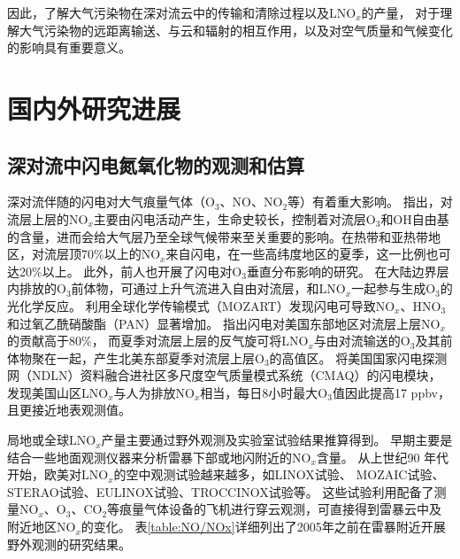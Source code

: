 因此，了解大气污染物在深对流云中的传输和清除过程以及LNO$_x$的产量，
对于理解大气污染物的远距离输送、与云和辐射的相互作用，以及对空气质量和气候变化的影响具有重要意义。



\section{国内外研究进展}

\subsection{深对流中闪电氮氧化物的观测和估算} \label{sec:intro_lnox}

深对流伴随的闪电对大气痕量气体（O$_3$、NO、NO$_2$等）有着重大影响\citep{DeCaria.2005,Schumann.2007,Ott.2010,Banerjee.2014}。
\citet{Levy.1996}指出，对流层上层的NO$_x$主要由闪电活动产生，生命史较长，控制着对流层O$_3$和OH自由基的含量，进而会给大气层乃至全球气候带来至关重要的影响。在热带和亚热带地区，对流层顶70\%以上的NO$_x$来自闪电，在一些高纬度地区的夏季，这一比例也可达20\%以上\citep{Jourdain.2001,Martin.2002}。
此外，前人也开展了闪电对O$_3$垂直分布影响的研究。
在大陆边界层内排放的O$_3$前体物，可通过上升气流进入自由对流层，和LNO$_x$一起参与生成O$_3$的光化学反应\citep{Bond.2002}。
\citet{Tie.2001}利用全球化学传输模式（MOZART）发现闪电可导致NO$_x$、HNO$_3$和过氧乙酰硝酸酯（PAN）显著增加。
\citet{Cooper.2009}指出闪电对美国东部地区对流层上层NO$_x$的贡献高于80\%，
而夏季对流层上层的反气旋可将LNO$_x$与由对流输送的O$_3$及其前体物聚在一起，产生北美东部夏季对流层上层O$_3$的高值区。
\citet{Kang.2020}将美国国家闪电探测网（NDLN）资料融合进社区多尺度空气质量模式系统（CMAQ）的闪电模块，发现美国山区LNO$_x$与人为排放NO$_x$相当，每日8小时最大O$_3$值因此提高17 ppbv，且更接近地表观测值。

局地或全球LNO$_x$产量主要通过野外观测及实验室试验结果推算得到。
早期主要是结合一些地面观测仪器来分析雷暴下部或地闪附近的NO$_x$含量。
从上世纪90 年代开始，欧美对LNO$_x$的空中观测试验越来越多，如LINOX试验\citep{Huntrieser.1998}、 MOZAIC试验\citep{Marenco.1998}、
STERAO试验\citep{Dye.2000}、EULINOX试验\citep{Holler.2000}、TROCCINOX试验\citep{Huntrieser.2007}等。
这些试验利用配备了测量NO$_x$、O$_3$、CO$_2$等痕量气体设备的飞机进行穿云观测，可直接得到雷暴云中及附近地区NO$_x$的变化。
表\ref{table:NO/NOx}详细列出了2005年之前在雷暴附近开展野外观测的研究结果。

